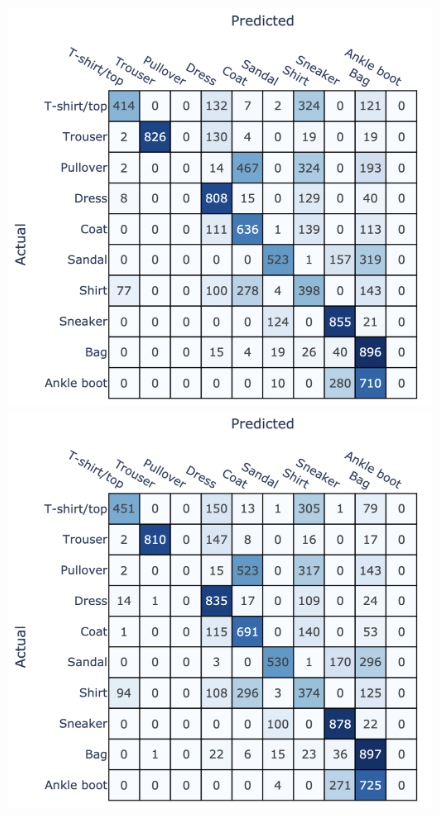 \begin{figure}[!htb]
    \begin{minipage}{0.33\textwidth}
      \centering
      \includegraphics[width=1\linewidth]{images/CM_HybridPipeline_MajorityMapping_SVC.png}
    \end{minipage}\hfill
    \begin{minipage}{0.33\textwidth}
      \centering
      \includegraphics[width=1\linewidth]{images/CM_HybridPipeline_MajorityMapping_FCNN.png}

\end{minipage}
\end{figure}
